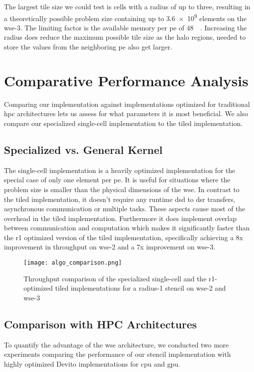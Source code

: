 The largest tile size we could test is  cells with a radius of up to three, resulting in a theoretically possible problem size containing up to \num{3.6e9} elements on the \ac{wse}-3. The limiting factor is the available memory per \ac{pe} of \qty{48}{\kilo\byte}. Increasing the radius does reduce the maximum possible tile size as the halo regions, needed to store the values from the neighboring \ac{pe} also get larger.



\section{Comparative Performance Analysis}
Comparing our implementation against implementations optimized for traditional \ac{hpc} architectures lets us assess for what parameters it is most beneficial. We also compare our specialized single-cell implementation to the tiled implementation.  

\subsection{Specialized vs. General Kernel}
The single-cell implementation is a heavily optimized implementation for the special case of only one element per \ac{pe}. It is useful for situations where the problem size is smaller than the physical dimensions of the \ac{wse}. In contrast to the tiled implementation, it doesn't require any runtime \ac{dsd} to \ac{dsr} transfers, asynchronous communication or multiple tasks. These aspects cause most of the overhead in the tiled implementation. Furthermore it does implement overlap between communication and computation which makes it significantly faster than the r1 optimized version of the tiled implementation, specifically achieving a 8x improvement in throughput on \ac{wse}-2 and a 7x improvement on \ac{wse}-3.
\begin{figure}[h]
    \centering
    \texttt{[image: algo\_comparison.png]}
    \caption{Throughput comparison of the specialized single-cell and the r1-optimized tiled implementations for a radius-1 stencil on \ac{wse}-2 and \ac{wse}-3}
    \label{fig:algo_comparison}
\end{figure}

\subsection{Comparison with HPC Architectures}
To quantify the advantage of the \ac{wse} architecture, we conducted two more experiments comparing the performance of our stencil implementation with highly optimized Devito implementations for \ac{cpu} and \ac{gpu}. 

